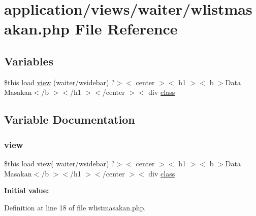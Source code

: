 \hypertarget{wlistmasakan_8php}{}\section{application/views/waiter/wlistmasakan.php File Reference}
\label{wlistmasakan_8php}
\subsection*{Variables}
\begin{DoxyCompactItemize}
\item 
\$this load \mbox{\hyperlink{wlistmasakan_8php_a0acc3c7118574906981125e97e0194e6}{view}} (\textquotesingle{}waiter/wsidebar\textquotesingle{}) ?$>$$<$ center $>$$<$ h1 $>$$<$ b $>$Data Masakan$<$/b $>$$<$/h1 $>$$<$/center $>$$<$ div \mbox{\hyperlink{waiter_2olaporan_8php_a185c73c6507391d1eb38c776b68ce96d}{class}}
\end{DoxyCompactItemize}


\subsection{Variable Documentation}
\mbox{\label{wlistmasakan_8php_a0acc3c7118574906981125e97e0194e6}} 
\subsubsection{\texorpdfstring{view}{view}}
{\footnotesize\ttfamily \$this load view( \textquotesingle{}waiter/wsidebar\textquotesingle{}) ?$>$$<$ center $>$$<$ h1 $>$$<$ b $>$Data Masakan$<$/b $>$$<$/h1 $>$$<$/center $>$$<$ div \mbox{\hyperlink{waiter_2olaporan_8php_a185c73c6507391d1eb38c776b68ce96d}{class}}}

{\bfseries Initial value\+:}
\begin{DoxyCode}{0}
\DoxyCodeLine{=\textcolor{stringliteral}{"kotak jarakatas"}>}

\end{DoxyCode}


Definition at line 18 of file wlistmasakan.\+php.

